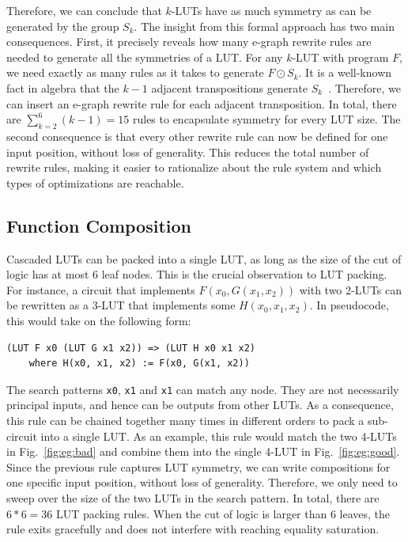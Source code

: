 Therefore, we can conclude that $k$-LUTs have as much symmetry as can be
generated by the group $S_k$. The insight from this formal approach has two
main consequences. First, it precisely reveals how many e-graph rewrite rules
are needed to generate all the symmetries of a LUT. For any $k$-LUT with
program $F$, we need exactly as many rules as it takes to generate $F \odot
    S_k$. It is a well-known fact in algebra that the $k-1$ adjacent transpositions
generate $S_k$~\cite{sgroup}. Therefore, we can insert an e-graph rewrite rule
for each adjacent transposition. In total, there are $\sum_{k=2}^{6} (k-1) =
    15$ rules to encapsulate symmetry for every LUT size. The second consequence is
that every other rewrite rule can now be defined for one input position,
without loss of generality. This reduces the total number of rewrite rules,
making it easier to rationalize about the rule system and which types of
optimizations are reachable.

\subsection{Function Composition}\label{sec:rewrites:composition}

Cascaded LUTs can be packed into a single LUT, as long as the size of the cut
of logic has at most 6 leaf nodes. This is the crucial observation to LUT
packing. For instance, a circuit that implements $F(x_0, G(x_1, x_2))$ with two
2-LUTs can be rewritten as a 3-LUT that implements some $H(x_0, x_1, x_2)$. In
pseudocode, this would take on the following form:

\begin{lstlisting}
(LUT F x0 (LUT G x1 x2)) => (LUT H x0 x1 x2)
    where H(x0, x1, x2) := F(x0, G(x1, x2))
\end{lstlisting}

The search patterns \texttt{x0}, \texttt{x1} and \texttt{x1} can match any
node. They are not necessarily principal inputs, and hence can be outputs from
other LUTs. As a consequence, this rule can be chained together many times in
different orders to pack a sub-circuit into a single LUT. As an example, this
rule would match the two 4-LUTs in Fig.~\ref{fig:eg:bad} and combine them into
the single 4-LUT in Fig.~\ref{fig:eg:good}. Since the previous rule captures
LUT symmetry, we can write compositions for one specific input position,
without loss of generality. Therefore, we only need to sweep over the size of
the two LUTs in the search pattern. In total, there are $6*6 = 36$ LUT packing
rules. When the cut of logic is larger than 6 leaves, the rule exits gracefully
and does not interfere with reaching equality saturation.

